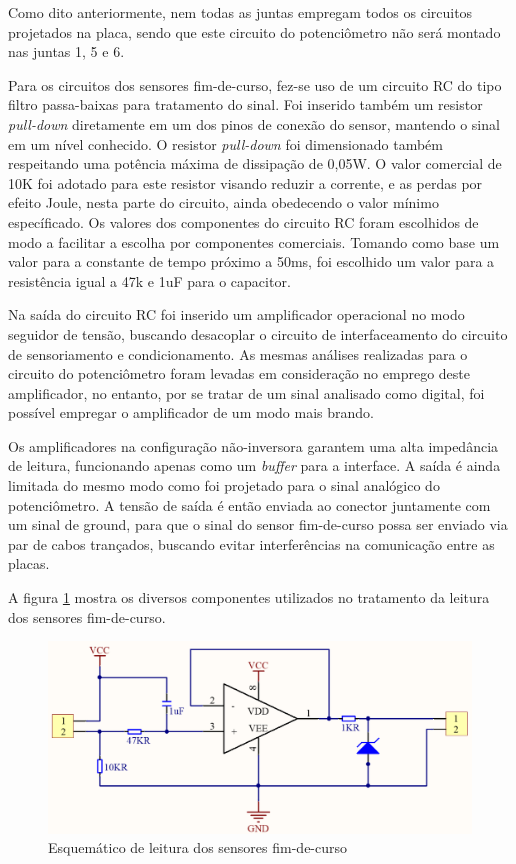Como dito anteriormente, nem todas as juntas empregam todos os circuitos projetados
na placa, sendo que este circuito do potenciômetro não será montado nas juntas 1,
5 e 6.

Para os circuitos dos sensores fim-de-curso, fez-se uso de um circuito 
RC do tipo filtro passa-baixas para tratamento do sinal. 
Foi inserido também um resistor \textit{pull-down} diretamente 
em um dos pinos de conexão do sensor, mantendo o sinal em um nível 
conhecido. O resistor \textit{pull-down} foi dimensionado também respeitando
uma potência máxima de dissipação de 0,05W.
O valor comercial de 10K foi adotado para este resistor visando reduzir a
corrente, e as perdas por efeito Joule, nesta parte do circuito, 
ainda obedecendo o valor mínimo específicado. 
Os valores dos componentes do circuito RC foram escolhidos de modo a 
facilitar a escolha por componentes comerciais. Tomando como base um 
valor para a constante de tempo próximo a 50ms, foi escolhido um valor 
para a resistência igual a 47k e 1uF para o capacitor.

Na saída do circuito RC foi inserido um amplificador operacional no 
modo seguidor de tensão, buscando desacoplar o circuito de 
interfaceamento do circuito de sensoriamento e condicionamento. 
As mesmas análises realizadas para o circuito do potenciômetro foram 
levadas em consideração no emprego deste amplificador, no entanto, por 
se tratar de um sinal analisado como digital, foi possível empregar o 
amplificador de um modo mais brando.

Os amplificadores na configuração não-inversora garantem uma alta impedância 
de leitura, funcionando apenas como um \textit{buffer} para a interface.
A saída é ainda limitada do mesmo modo como foi projetado para o sinal
analógico do potenciômetro. 
A tensão de saída é então enviada ao conector 
juntamente com um sinal de ground, para que o sinal do sensor 
fim-de-curso possa ser enviado via par de cabos trançados, buscando evitar
interferências na comunicação entre as placas.

A figura \ref{fig:Esquematico-sensor-switch} mostra os diversos
componentes utilizados no tratamento da leitura dos sensores
fim-de-curso.

\begin{figure}[ht]
    \caption{Esquemático de leitura dos sensores fim-de-curso}    
    \begin{centering}

        \includegraphics[width=0.65\columnwidth]{images/pcbs/SensorPCB-Switch.png}
    
    \par\end{centering}

    \label{fig:Esquematico-sensor-switch}
\end{figure}

